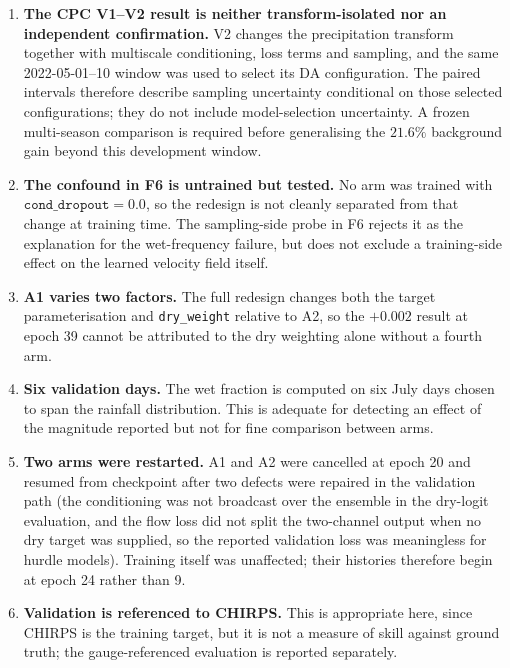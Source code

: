 \begin{enumerate}
  \item \textbf{The CPC V1--V2 result is neither transform-isolated nor an
    independent confirmation.} V2 changes the precipitation transform together
    with multiscale conditioning, loss terms and sampling, and the same
    2022-05-01--10 window was used to select its DA configuration. The paired
    intervals therefore describe sampling uncertainty conditional on those
    selected configurations; they do not include model-selection uncertainty.
    A frozen multi-season comparison is required before generalising the
    $21.6\%$ background gain beyond this development window.
  \item \textbf{The confound in F6 is untrained but tested.} No arm was trained
    with $\texttt{cond\_dropout}=0.0$, so the redesign is not cleanly separated
    from that change at training time. The sampling-side probe in F6 rejects it
    as the explanation for the wet-frequency failure, but does not exclude a
    training-side effect on the learned velocity field itself.
  \item \textbf{A1 varies two factors.} The full redesign changes both the
    target parameterisation and \texttt{dry\_weight} relative to A2, so the
    $+0.002$ result at epoch 39 cannot be attributed to the dry weighting alone
    without a fourth arm.
  \item \textbf{Six validation days.} The wet fraction is computed on six July
    days chosen to span the rainfall distribution. This is adequate for
    detecting an effect of the magnitude reported but not for fine comparison
    between arms.
  \item \textbf{Two arms were restarted.} A1 and A2 were cancelled at epoch 20
    and resumed from checkpoint after two defects were repaired in the
    validation path (the conditioning was not broadcast over the ensemble in the
    dry-logit evaluation, and the flow loss did not split the two-channel output
    when no dry target was supplied, so the reported validation loss was
    meaningless for hurdle models). Training itself was unaffected; their
    histories therefore begin at epoch 24 rather than 9.
  \item \textbf{Validation is referenced to CHIRPS.} This is appropriate here,
    since CHIRPS is the training target, but it is not a measure of skill
    against ground truth; the gauge-referenced evaluation is reported
    separately.
\end{enumerate}

